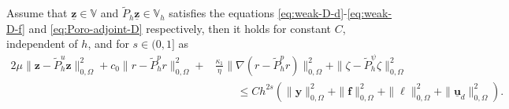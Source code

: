 \documentclass[smallextended]{svjour3}
\renewenvironment{proof}{\noindent{\it Proof.}}{\hfill$\square$}
\numberwithin{equation}{section}
\numberwithin{figure}{section}
\numberwithin{table}{section}
\newcommand\bI{\mathbf{I}}
\newcommand\bV{\mathbf{V}}
\newcommand\bPi{\boldsymbol{\Pi}}
\newcommand\ff{\boldsymbol{f}}
\newcommand{\tP}{\tilde{P}}
\newcommand\buu{\underline{\boldsymbol{u}}}
\newcommand\buz{\underline{\boldsymbol{z}}}
\newcommand\by{\boldsymbol{y}}
\newcommand\bu{\boldsymbol{u}}
\newcommand\bv{\boldsymbol{v}}
\newcommand\bz{\boldsymbol{z}}
\newcommand\cT{\mathcal{T}}
\newcommand{\bbV}{\mathbb{V}}
\newcommand{\cblue}[1]{\textcolor{blue}{#1}}
\begin{document}
	\begin{corollary} \label{lem:proj-adjoint}
	Assume that $\buz \in \bbV$ and $\tP_h \buz \in \bbV_h$
	 satisfies the equations \eqref{eq:weak-D-d}-\eqref{eq:weak-D-f} and \eqref{eq:Poro-adjoint-D} respectively, then it holds for constant $C$, independent of $h$, and for $s \in (0, 1]$ as
	 \begin{equation}\label{est:adjointproj-D}
	 	\begin{aligned} 
	 		2 \mu \| \bz - \tP_h^u \bz \|_{0, \Omega}^2 + c_0 \| r - \tP_h^p r \|_{0, \Omega}^2 + &\frac{\kappa_1}{\eta} \| \nabla (r - \tP_h^p r )\|_{0, \Omega}^2+ \| \zeta - \tP_h^{\psi} \zeta \|_{0, \Omega}^2 \\
	 		&\qquad \le C h^{2s} \left( \|\by \|_{0, \Omega}^2 + \|\ff \|_{0, \Omega}^2 + \|\ell\|_{0, \Omega}^2 + \| \buu_d\|_{0, \Omega}^2 \right).
	 	\end{aligned}
	 \end{equation}
	\end{corollary}
\end{document}
